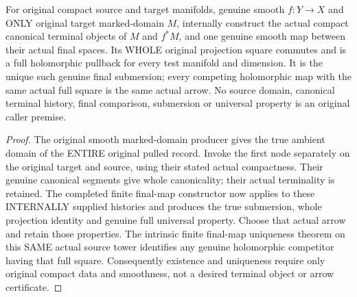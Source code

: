 \begin{theorem}
\label{hir:smooth-original-compact-terminal-arrow-producer}
\leanok
{}
For original compact source and target manifolds, genuine smooth $f:Y\to X$
and ONLY original target marked-domain $M$, internally construct the actual
compact canonical terminal objects of $M$ and $f^*M$, and one genuine smooth
map between their actual final spaces. Its WHOLE original projection square
commutes and is a full holomorphic pullback for every test manifold and
dimension. It is the unique such genuine final submersion; every competing
holomorphic map with the same actual full square is the same actual arrow.
No source domain, canonical terminal history, final comparison, submersion
or universal property is an original caller premise.
\end{theorem}
\begin{proof}
The original smooth marked-domain producer gives the true ambient domain
of the ENTIRE original pulled record. Invoke the first node separately
on the original target and source, using their stated actual compactness.
Their genuine canonical segments give whole canonicality; their actual
terminality is retained. The completed finite final-map constructor now
applies to these INTERNALLY supplied histories and produces the true
submersion, whole projection identity and genuine full universal property.
Choose that actual arrow and retain those properties. The intrinsic finite
final-map uniqueness theorem on this SAME actual source tower identifies
any genuine holomorphic competitor having that full square. Consequently
existence and uniqueness require only original compact data and smoothness,
not a desired terminal object or arrow certificate.
\end{proof}

